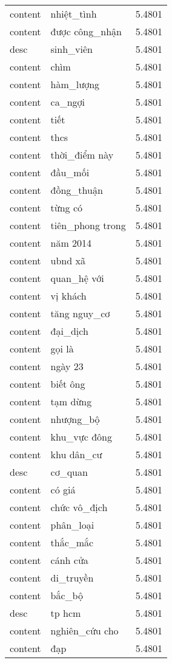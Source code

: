 \documentclass{article}
\begin{document}
\begin{tabular}{lll}
content & nhiệt\_tình & 5.4801\\
content & được công\_nhận & 5.4801\\
desc & sinh\_viên & 5.4801\\
content & chìm & 5.4801\\
content & hàm\_lượng & 5.4801\\
content & ca\_ngợi & 5.4801\\
content & tiết & 5.4801\\
content & thcs & 5.4801\\
content & thời\_điểm này & 5.4801\\
content & đầu\_mối & 5.4801\\
content & đồng\_thuận & 5.4801\\
content & từng có & 5.4801\\
content & tiên\_phong trong & 5.4801\\
content & năm 2014 & 5.4801\\
content & ubnd xã & 5.4801\\
content & quan\_hệ với & 5.4801\\
content & vị khách & 5.4801\\
content & tăng nguy\_cơ & 5.4801\\
content & đại\_dịch & 5.4801\\
content & gọi là & 5.4801\\
content & ngày 23 & 5.4801\\
content & biết ông & 5.4801\\
content & tạm dừng & 5.4801\\
content & nhượng\_bộ & 5.4801\\
content & khu\_vực đông & 5.4801\\
content & khu dân\_cư & 5.4801\\
desc & cơ\_quan & 5.4801\\
content & có giá & 5.4801\\
content & chức vô\_địch & 5.4801\\
content & phân\_loại & 5.4801\\
content & thắc\_mắc & 5.4801\\
content & cánh cửa & 5.4801\\
content & di\_truyền & 5.4801\\
content & bắc\_bộ & 5.4801\\
desc & tp hcm & 5.4801\\
content & nghiên\_cứu cho & 5.4801\\
content & đạp & 5.4801\\

\end{tabular}
\end{document}
